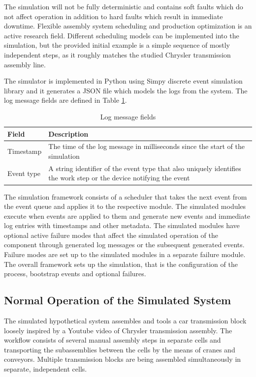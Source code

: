 \documentclass[journal]{IEEEtran}
\begin{document}
The simulation will not be fully deterministic and contains soft faults which do not affect operation in addition to hard faults which result in immediate downtime.
Flexible assembly system scheduling and production optimization is an active research field. Different scheduling models can be implemented into the simulation,
but the provided initial example is a simple sequence of mostly independent steps, as it roughly matches the studied Chrysler transmission assembly line.

The simulator is implemented in Python using Simpy discrete event simulation library and it generates a JSON file which models the logs from the system.
The log message fields are defined in Table \ref{fields}.

\begin{table}[!t]
\renewcommand{\arraystretch}{1.3}
\caption{Log message fields}
\label{fields}
\centering
\begin{tabular}{|p{25mm}|p{45mm}|}
\hline
Field & Description \\
\hline
\hline
Timestamp & The time of the log message in milliseconds since the start of the simulation \\
\hline
Event type & A string identifier of the event type that also uniquely identifies the work step or the device notifying the event \\
\hline
\end{tabular}
\end{table}

The simulation framework consists of a scheduler that takes the next event from the event queue and applies it to the respective module. The simulated modules
execute when events are applied to them and generate new events and immediate log entries with timestamps and other metadata.
The simulated modules have optional active failure modes that affect the simulated operation of the component through
generated log messages or the subsequent generated events. Failure modes are set up to the simulated modules in a separate failure module.
The overall framework sets up the simulation, that is the configuration of the process, bootstrap events and optional failures.

\subsection{Normal Operation of the Simulated System}
The simulated hypothetical system assembles and tools a car transmission block loosely inspired by a Youtube video of Chrysler transmission assembly\cite{transmission}.
The workflow consists of several manual assembly steps in separate cells and transporting the subassemblies between the cells by the means of
cranes and conveyors. Multiple transmission blocks are being assembled simultaneously in separate, independent cells.
\end{document}
